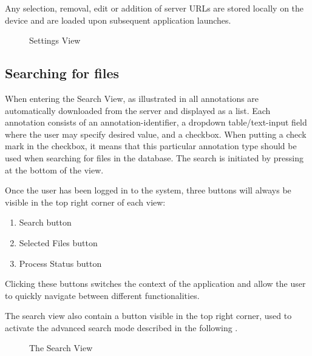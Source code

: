 Any selection, removal, edit or addition of server URLs are stored locally on the device and
are loaded upon subsequent application launches.


\begin{figure}[h]
\caption{Settings View}
\label{fig:and_settings_man}
\end{figure}
\FloatBarrier


\subsection{Searching for files}\label{sec:and_search}

When entering the Search View, as illustrated in  all annotations are automatically
downloaded from the server and displayed as a list. Each annotation consists of an annotation-identifier,
a dropdown table/text-input field where the user may specify desired value, and a checkbox. When putting
a check mark in the checkbox, it means that this particular annotation type should be used when searching
for files in the database. The search is initiated by pressing  at the bottom of the view.

Once the user has been logged in to the system, three buttons will always be visible in the top right corner of each view:
\begin{enumerate}
\item Search button
\item Selected Files button
\item Process Status button
\end{enumerate}

Clicking these buttons switches the context of the application and allow the user to quickly navigate between different functionalities.

The search view also contain a button visible in the top right corner, used to activate the advanced search mode described in the following . 

\begin{figure}[h]
\caption{The Search View}
\label{fig:and_search_man}
\end{figure}
\FloatBarrier


